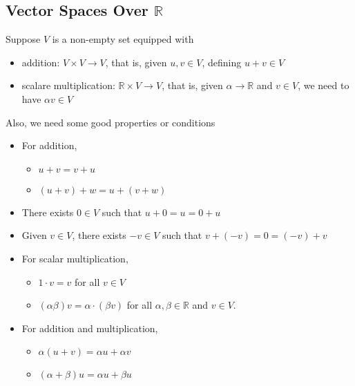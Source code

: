 \subsection{Vector Spaces Over \(\mathbb{R} \) }
\begin{definition}
    Suppose \(V\) is a non-empty set equipped with 
    \begin{itemize}
        \item addition: \(V \times V \to V\), that is, given \(u,v \in V\), defining \(u + v \in V\)
        \item scalare multiplication: \(\mathbb{R}  \times V \to V\), that is, given \(\alpha \to \mathbb{R} \) and \(v \in V\), we need to have \(\alpha v \in V\)       
    \end{itemize} 
    Also, we need some good properties or conditions 
    \begin{itemize}
        \item For addition, 
        \begin{itemize}
            \item \(u + v = v + u\) 
            \item \((u + v) + w = u + (v + w)\)
        \end{itemize}
        \item There exists \(0 \in V\) such that \(u + 0 = u = 0 + u\)
        \item Given \(v \in V\), there exists \(-v \in V\) such that \(v + (-v) = 0 = (-v) + v\)
        \item For scalar multiplication,
        \begin{itemize}
            \item \(1 \cdot v = v\) for all \(v \in V\) 
            \item \((\alpha \beta ) v = \alpha \cdot (\beta v)\) for all \(\alpha , \beta \in \mathbb{R} \) and \(v \in V\).   
        \end{itemize}
        \item For addition and multiplication, 
        \begin{itemize}
            \item \(\alpha (u + v) = \alpha u + \alpha v\)
            \item \((\alpha + \beta )u = \alpha u + \beta u\)  
        \end{itemize}
    \end{itemize}

\end{definition}